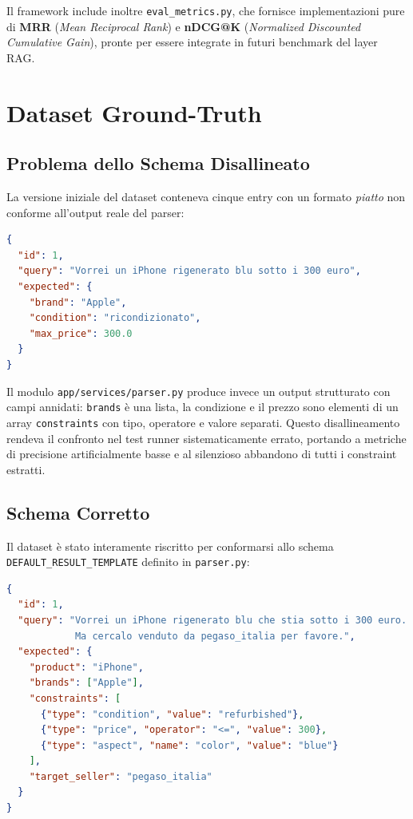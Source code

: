 Il framework include inoltre \texttt{eval\_metrics.py}, che fornisce
implementazioni pure di \textbf{MRR} (\emph{Mean Reciprocal Rank}) e
\textbf{nDCG@K} (\emph{Normalized Discounted Cumulative Gain}), pronte
per essere integrate in futuri benchmark del layer RAG.

\section{Dataset Ground-Truth}
\label{sec:eval-dataset}

\subsection{Problema dello Schema Disallineato}
\label{subsec:schema-drift}

La versione iniziale del dataset conteneva cinque entry con un formato
\emph{piatto} non conforme all'output reale del parser:

\begin{lstlisting}[language=json, caption={Formato obsoleto del dataset (pre-refactoring)}]
{
  "id": 1,
  "query": "Vorrei un iPhone rigenerato blu sotto i 300 euro",
  "expected": {
    "brand": "Apple",
    "condition": "ricondizionato",
    "max_price": 300.0
  }
}
\end{lstlisting}

Il modulo \texttt{app/services/parser.py} produce invece un output
strutturato con campi annidati: \texttt{brands} è una lista, la
condizione e il prezzo sono elementi di un array \texttt{constraints}
con tipo, operatore e valore separati. Questo disallineamento rendeva
il confronto nel test runner sistematicamente errato, portando a
metriche di precisione artificialmente basse e al silenzioso abbandono
di tutti i constraint estratti.

\subsection{Schema Corretto}
\label{subsec:correct-schema}

Il dataset è stato interamente riscritto per conformarsi allo schema
\texttt{DEFAULT\_RESULT\_TEMPLATE} definito in \texttt{parser.py}:

\begin{lstlisting}[language=json, caption={Formato corretto del dataset, allineato al parser LLM}]
{
  "id": 1,
  "query": "Vorrei un iPhone rigenerato blu che stia sotto i 300 euro.
            Ma cercalo venduto da pegaso_italia per favore.",
  "expected": {
    "product": "iPhone",
    "brands": ["Apple"],
    "constraints": [
      {"type": "condition", "value": "refurbished"},
      {"type": "price", "operator": "<=", "value": 300},
      {"type": "aspect", "name": "color", "value": "blue"}
    ],
    "target_seller": "pegaso_italia"
  }
}
\end{lstlisting}

